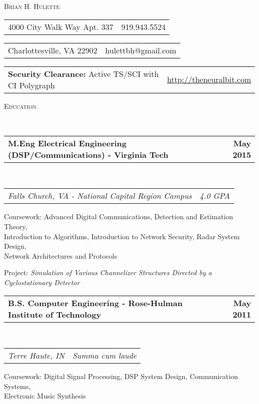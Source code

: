 \documentclass[10pt]{article}
\makeatletter
\newenvironment{changemargin}[2]{%
  \begin{list}{}{%
    \setlength{\topsep}{0pt}%
    \setlength{\leftmargin}{#1}%
    \setlength{\rightmargin}{#2}%
    \setlength{\listparindent}{\parindent}%
    \setlength{\itemindent}{\parindent}%
    \setlength{\parsep}{\parskip}%
  }%
  \item[]}{\end{list}
}
\newcommand{\lineover}{
	\begin{changemargin}{-0.05in}{-0.05in}
		\vspace*{-8pt}
		\hrulefill \\
		\vspace*{-2pt}
	\end{changemargin}
}
\newenvironment{body} {
	\begin{changemargin}{-0.25in}{-0.5in}
  }
	{\end{changemargin}
}
\newenvironment{fullbody} {
	\begin{changemargin}{-0.5in}{-0.5in}
  }
	{\end{changemargin}
}
\newcommand{\headerrule}[1]{
    \vspace*{5pt}
    \begin{changemargin}{-0.5in}{-0.5in}
        \scshape{#1}\\
    \lineover
    \end{changemargin}
}
\newcommand{\headerrow}[2]
{\begin{tabular*}{\linewidth}{@{}l@{\extracolsep{\fill}}r}
	#1 &
	#2 \\
\end{tabular*}}
\makeatother
\begin{document}
\thispagestyle{empty}
\begin{center}
{\LARGE \scshape{Brian H. Hulette}}
\end{center}

\vspace{+1.0em}
\begin{fullbody}
\headerrow
{4000 City Walk Way Apt. 337}
{919.943.5524}

\headerrow
{Charlottesville, VA 22902}
{hulettbh@gmail.com}

\headerrow
{\textbf{Security Clearance:} Active TS/SCI with CI Polygraph}
{\url{http://theneuralbit.com}}
\end{fullbody}

\headerrule{Education}
\begin{body}
    \headerrow
        {\textbf{M.Eng Electrical Engineering (DSP/Communications) - Virginia Tech}}
        {\textbf{May 2015}}
    \\
    \headerrow
        {\emph{Falls Church, VA - National Capital Region Campus}}
        {\emph{4.0 GPA}}
    \vspace{-1.7em}

    \begin{description*}
        \item[Coursework:]
        Advanced Digital Communications, Detection and Estimation Theory, \\
        Introduction to Algorithms, Introduction to Network Security, Radar System Design, \\
        Network Architectures and Protocols
        \item[Project:]
            \emph{Simulation of Various Channelizer Structures
                  Directed by a Cyclostationary Detector}
    \end{description*}

    \vspace{+0.5em}

    \headerrow
        {\textbf{B.S. Computer Engineering - Rose-Hulman Institute of Technology}}
        {\textbf{May 2011}}
    \\
    \headerrow
        {\emph{Terre Haute, IN}}
        {\emph{Summa cum laude}}
    \vspace{-1.7em}
    \begin{description*}
        \item[Coursework:]
        Digital Signal Processing, DSP System Design, Communication Systems, \\
        Electronic Music Synthesis
    \end{description*}
\end{body}
\end{document}
